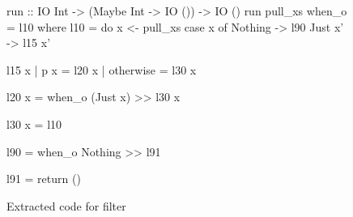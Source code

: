 \begin{figure}
\begin{code}
run :: IO Int -> (Maybe Int -> IO ()) -> IO ()
run pull_xs when_o = l10
 where
  l10 = do  x  <- pull_xs
            case x of
             Nothing -> l90
             Just x' -> l15 x'

  l15 x | p x       = l20 x
        | otherwise = l30 x

  l20 x =   when_o (Just x)  >> l30 x

  l30 x =   l10

  l90   =   when_o Nothing  >> l91

  l91   =   return ()
\end{code}
\caption{Extracted code for filter}
\label{fig:extract:filter}
\end{figure}

